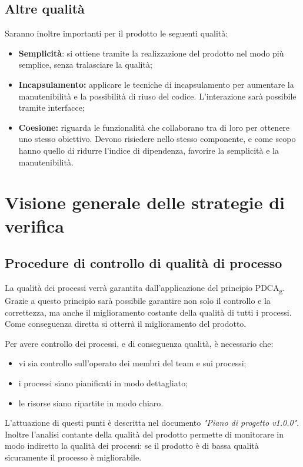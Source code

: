 \documentclass[12pt,a4paper,titlepage]{article}
\begin{document}
		\subsection{Altre qualità}
		Saranno inoltre importanti per il prodotto le seguenti qualità:
		\begin{itemize}
			\item \textbf{Semplicità}: si ottiene tramite la realizzazione del prodotto nel modo più semplice, senza 
			tralasciare la qualità;
			\item \textbf{Incapsulamento:} applicare le tecniche di incapsulamento per aumentare la manutenibilità e la possibilità di riuso del codice. L'interazione sarà possibile tramite interfacce;
			\item \textbf{Coesione:} riguarda le funzionalità che collaborano tra di loro per ottenere uno stesso obiettivo. Devono risiedere nello stesso componente, e come scopo hanno quello di ridurre l'indice di dipendenza, favorire la semplicità e la manutenibilità.
		\end{itemize}
	\section{Visione generale delle strategie di verifica}
	\subsection{Procedure di controllo di qualità di processo}
	La qualità dei processi verrà garantita dall'applicazione del principio PDCA\textsubscript{g}. Grazie a questo principio sarà possibile garantire non solo il controllo e la correttezza, ma anche il miglioramento costante della qualità di tutti i processi. Come conseguenza diretta si otterrà il miglioramento del prodotto.
	
	Per avere controllo dei processi, e di conseguenza qualità, è necessario che:
	\begin{itemize}
		\item vi sia controllo sull'operato dei membri del team e sui processi;
		\item i processi siano pianificati in modo dettagliato;
		\item le risorse siano ripartite in modo chiaro.
	\end{itemize}
	L'attuazione di questi punti è descritta nel documento \textit{"Piano di progetto v1.0.0"}. Inoltre l'analisi contante della qualità del prodotto permette di monitorare in modo indiretto la qualità dei processi: se il prodotto è di bassa qualità sicuramente il processo è migliorabile.
	
\end{document}
